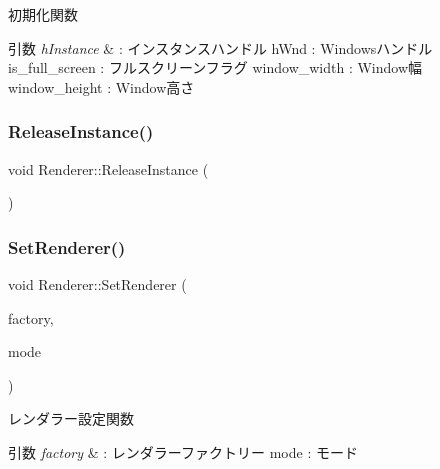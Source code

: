 初期化関数 


\begin{DoxyParams}{引数}
{\em h\+Instance} & \+: インスタンスハンドル h\+Wnd \+: Windowsハンドル is\+\_\+full\+\_\+screen \+: フルスクリーンフラグ window\+\_\+width \+: Window幅 window\+\_\+height \+: Window高さ \\
\hline
\end{DoxyParams}
\mbox{\label{class_renderer_aa7ac523172faaf376ecddaed4bdc0781}} 
\subsubsection{\texorpdfstring{Release\+Instance()}{ReleaseInstance()}}
{\footnotesize\ttfamily void Renderer\+::\+Release\+Instance (\begin{DoxyParamCaption}{ }\end{DoxyParamCaption})\hspace{0.3cm}{\ttfamily [static]}}

\mbox{\label{class_renderer_a249147991a8187a3d373fd6bd43e8c54}} 
\subsubsection{\texorpdfstring{Set\+Renderer()}{SetRenderer()}}
{\footnotesize\ttfamily void Renderer\+::\+Set\+Renderer (\begin{DoxyParamCaption}\item[{\mbox{\hyperlink{class_renderer_factory}{Renderer\+Factory}} $\ast$}]{factory,  }\item[{\mbox{\hyperlink{class_renderer_ab5a9379ccadcf2b3394c61cf8c835fec}{M\+O\+DE}}}]{mode }\end{DoxyParamCaption})}



レンダラー設定関数 


\begin{DoxyParams}{引数}
{\em factory} & \+: レンダラーファクトリー mode \+: モード \\
\hline
\end{DoxyParams}
\mbox{\label{class_renderer_ae865246d6a04d467ac22458f6f5f69d4}} 
